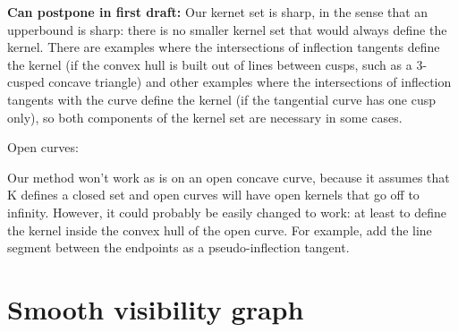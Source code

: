 \documentclass[12pt]{article}
\begin{document}

{\bf Can postpone in first draft:}
Our kernet set is sharp, in the sense that an upperbound is sharp:
there is no smaller kernel set that would always define the kernel.
There are examples where the intersections of inflection tangents
define the kernel (if the convex hull is built out of lines between cusps,
such as a 3-cusped concave triangle) and other examples where the
intersections of inflection tangents with the curve define the kernel
(if the tangential curve has one cusp only),
so both components of the kernel set are necessary in some cases.

Open curves:

Our method won't work as is on an open concave curve,
because it assumes that K defines a closed set
and open curves will have open kernels that go off to infinity.
However, it could probably be easily changed to work:
at least to define the kernel inside the convex hull of
the open curve.
For example, add the line segment between the endpoints as
a pseudo-inflection tangent.

\section{Smooth visibility graph}
\end{document}
